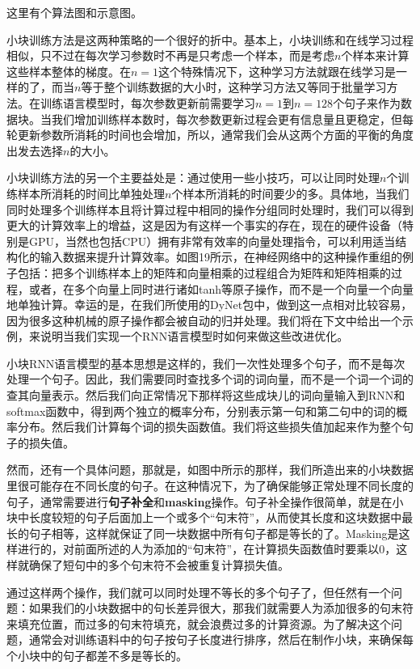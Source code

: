 \documentclass[10pt,a4paper]{ctexart}
\begin{document}
这里有个算法图和示意图。

小块训练方法是这两种策略的一个很好的折中。基本上，小块训练和在线学习过程相似，只不过在每次学习参数时不再是只考虑一个样本，而是考虑$n$个样本来计算这些样本整体的梯度。在$n=1$这个特殊情况下，这种学习方法就跟在线学习是一样的了，而当$n$等于整个训练数据的大小时，这种学习方法又等同于批量学习方法。在训练语言模型时，每次参数更新前需要学习$n=1$到$n=128$个句子来作为数据块。当我们增加训练样本数时，每次参数更新过程会更有信息量且更稳定，但每轮更新参数所消耗的时间也会增加，所以，通常我们会从这两个方面的平衡的角度出发去选择$n$的大小。

小块训练方法的另一个主要益处是：通过使用一些小技巧，可以让同时处理$n$个训练样本所消耗的时间比单独处理$n$个样本所消耗的时间要少的多。具体地，当我们同时处理多个训练样本且将计算过程中相同的操作分组同时处理时，我们可以得到更大的计算效率上的增益，这是因为有这样一个事实的存在，现在的硬件设备（特别是GPU，当然也包括CPU）拥有非常有效率的向量处理指令，可以利用适当结构化的输入数据来提升计算效率。如图19所示，在神经网络中的这种操作重组的例子包括：把多个训练样本上的矩阵和向量相乘的过程组合为矩阵和矩阵相乘的过程，或者，在多个向量上同时进行诸如tanh等原子操作，而不是一个向量一个向量地单独计算。幸运的是，在我们所使用的DyNet包中，做到这一点相对比较容易，因为很多这种机械的原子操作都会被自动的归并处理。我们将在下文中给出一个示例，来说明当我们实现一个RNN语言模型时如何来做这些改进优化。

小块RNN语言模型的基本思想是这样的，我们一次性处理多个句子，而不是每次处理一个句子。因此，我们需要同时查找多个词的词向量，而不是一个词一个词的查其向量表示。然后我们向正常情况下那样将这些成块儿的词向量输入到RNN和softmax函数中，得到两个独立的概率分布，分别表示第一句和第二句中的词的概率分布。然后我们计算每个词的损失函数值。我们将这些损失值加起来作为整个句子的损失值。

然而，还有一个具体问题，那就是，如图中所示的那样，我们所造出来的小块数据里很可能存在不同长度的句子。在这种情况下，为了确保能够正常处理不同长度的句子，通常需要进行\textbf{句子补全}和\textbf{masking}操作。句子补全操作很简单，就是在小块中长度较短的句子后面加上一个或多个“句末符”，从而使其长度和这块数据中最长的句子相等，这样就保证了同一块数据中所有句子都是等长的了。Masking是这样进行的，对前面所述的人为添加的“句末符”，在计算损失函数值时要乘以0，这样就确保了短句中的多个句末符不会被重复计算损失值。

通过这样两个操作，我们就可以同时处理不等长的多个句子了，但任然有一个问题：如果我们的小块数据中的句长差异很大，那我们就需要人为添加很多的句末符来填充位置，而过多的句末符填充，就会浪费过多的计算资源。为了解决这个问题，通常会对训练语料中的句子按句子长度进行排序，然后在制作小块，来确保每个小块中的句子都差不多是等长的。
\end{document}
